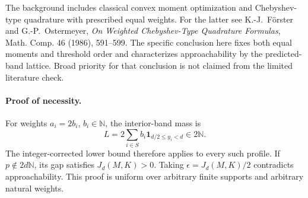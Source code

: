 The background includes classical convex moment optimization and
Chebyshev-type quadrature with prescribed equal weights.
For the latter see K.-J.~F\"orster and G.-P.~Ostermeyer,
\emph{On Weighted Chebyshev-Type Quadrature Formulas},
Math. Comp. 46 (1986), 591--599.
The specific conclusion here fixes both equal moments and threshold order
and characterizes approachability by the predicted-band lattice.  Broad
priority for that conclusion is not claimed from the limited literature check.

\paragraph{Proof of necessity.}
For weights \(a_i=2b_i\), \(b_i\in\mathbb N\), the interior-band mass is
\[
 L=2\sum_{i\in S}b_i\mathbf1_{d/2\le y_i<d}\in2\mathbb N.
\]
The integer-corrected lower bound therefore applies to every such profile.
If \(p\notin2d\mathbb N\), its gap satisfies \(J_d(M,K)>0\).  Taking
\(\epsilon=J_d(M,K)/2\) contradicts approachability.  This proof is
uniform over arbitrary finite supports and arbitrary natural weights.

